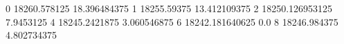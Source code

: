 0 18260.578125 18.396484375
1 18255.59375 13.412109375
2 18250.126953125 7.9453125
4 18245.2421875 3.060546875
6 18242.181640625 0.0
8 18246.984375 4.802734375
